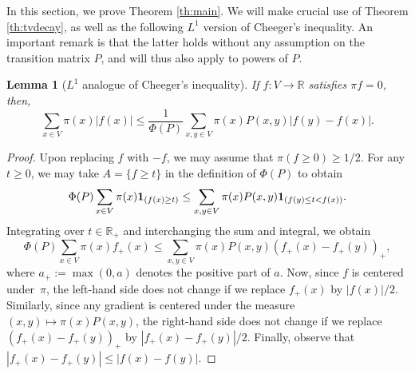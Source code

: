 \documentclass[10pt]{amsart}
\newtheorem{lemma}{Lemma}
\theoremstyle{definition}
\newcommand{\dR}{\mathbb {R}}
\begin{document}
In this section, we prove Theorem \ref{th:main}.
We will make crucial use of Theorem \ref{th:tvdecay}, as well as the following $L^1$ version of Cheeger's inequality. An important remark is that the latter holds without any assumption on the transition matrix $P$, and will thus also apply to powers of $P$.
\begin{lemma}[$L^1$ analogue of Cheeger's inequality]\label{lm:L1} If $f\colon V\to\dR$ satisfies $\pi f=0$, then,
\begin{equation*}
\sum_{x\in V}\pi(x)\left|f(x)\right| \le \frac{1}{\Phi(P)}\sum_{x,y\in V}\pi(x)P(x,y)\left|f(y)-f(x)\right|.
\end{equation*}
\end{lemma}
\begin{proof} Upon replacing $f$ with $-f$, we may assume that $\pi(f\ge 0)\ge 1/2$. For any $t\ge 0$, we may take $A=\{f\ge t\}$ in the definition of $\Phi(P)$ to obtain
\begin{equation*}
\Phi(P) \sum_{x\in V}\pi(x){\bf 1}_{(f(x)\ge t)} \le \sum_{x,y\in V}\pi(x)P(x,y){\bf 1}_{(f(y)\le t<f(x))}.
\end{equation*}
Integrating over $t\in\dR_+$ and interchanging the sum and integral, we obtain
\begin{equation*}
\Phi(P)\sum_{x\in V}\pi(x)f_+(x) \le \sum_{x,y\in V}\pi(x)P(x,y)(f_+(x)-f_+(y))_+,
\end{equation*}
where $a_+:=\max(0,a)$ denotes the positive part of $a$. Now, since $f$ is centered under~$\pi$, the left-hand side does not change if we replace $f_+(x)$ by $|f(x)|/2$. Similarly, since any gradient is centered under the measure $(x,y)\mapsto \pi(x)P(x,y)$, the right-hand side does not change if we replace $\left(f_+(x)-f_+(y)\right)_+$ by $\left|f_+(x)-f_+(y)\right|/2$. Finally, observe that $\left|f_+(x)-f_+(y)\right| \le|f(x)-f(y)|$.
\end{proof}
\end{document}
